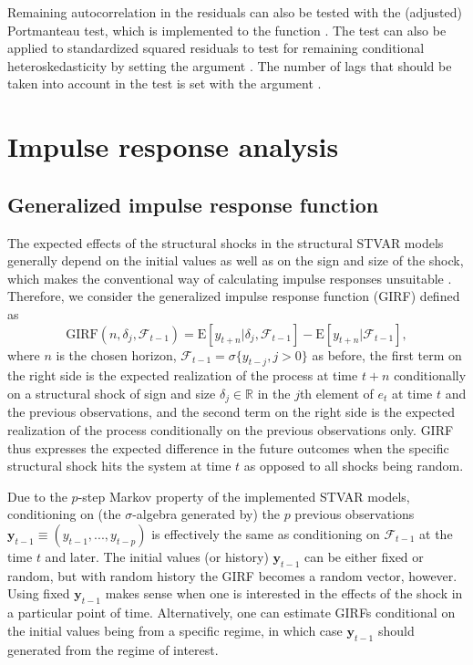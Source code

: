 \documentclass[nojss]{jss}
\begin{document}
Remaining autocorrelation in the residuals can also be tested with the (adjusted) Portmanteau test, which is implemented to the function . The test can also be applied to standardized squared residuals to test for remaining conditional heteroskedasticity by setting the argument . The number of lags that should be taken into account in the test is set with the argument .


\section{Impulse response analysis}\label{sec:impulseresponse}

\subsection{Generalized impulse response function}\label{sec:girf}

The expected effects of the structural shocks in the structural STVAR models generally depend on the initial values as well as on the sign and size of the shock, which makes the conventional way of calculating impulse responses unsuitable \citep[see, e.g.,][Chapter~4]{Kilian+Lutkepohl:2017}. Therefore, we  consider the generalized impulse response function (GIRF) \citep{Koop+Pesaran+Potter:1996} defined as
\begin{equation}\label{eq:girf}
\text{GIRF}(n,\delta_j,\mathcal{F}_{t-1}) = \text{E}[y_{t+n}|\delta_j,\mathcal{F}_{t-1}] - \text{E}[y_{t+n}|\mathcal{F}_{t-1}],
\end{equation}
where $n$ is the chosen horizon, $\mathcal{F}_{t-1}=\sigma\lbrace y_{t-j},j>0\rbrace$ as before, the first term on the right side is the expected realization of the process at time $t+n$ conditionally on a structural shock of sign and size $\delta_j \in\mathbb{R}$ in the $j$th element of $e_t$ at time $t$ and the previous observations, and the second term on the right side is the expected realization of the process conditionally on the previous observations only. GIRF thus expresses the expected difference in the future outcomes when the specific structural shock hits the system at time $t$ as opposed to all shocks being random.

Due to the $p$-step Markov property of the implemented STVAR models, conditioning on (the $\sigma$-algebra generated by) the $p$ previous observations $\boldsymbol{y}_{t-1}\equiv(y_{t-1},...,y_{t-p})$ is effectively the same as conditioning on $\mathcal{F}_{t-1}$ at the time $t$ and later. The initial values (or history) $\boldsymbol{y}_{t-1}$ can be either fixed or random, but with random history the GIRF becomes a random vector, however. Using fixed $\boldsymbol{y}_{t-1}$ makes sense when one is interested in the effects of the shock in a particular point of time. Alternatively, one can estimate GIRFs conditional on the initial values being from a specific regime, in which case $\boldsymbol{y}_{t-1}$ should generated from the regime of interest.
\end{document}
